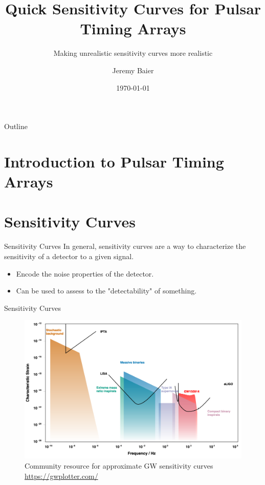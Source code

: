 \documentclass{beamer}
\title[PTA Sensitivity]{Quick Sensitivity Curves for Pulsar Timing Arrays}
\subtitle{Making unrealistic sensitivity curves more realistic}
\author[Jeremy Baier]{Jeremy Baier}
\institute[OSU]{Oregon State University}
\date{\today}
\begin{document}
\begin{frame}
    \titlepage
\end{frame}

\begin{frame}{Outline}
    \tableofcontents
\end{frame}

\section{Introduction to Pulsar Timing Arrays}






\section{Sensitivity Curves}
\begin{frame}{Sensitivity Curves}
    In general, sensitivity curves are a way to characterize the sensitivity of a detector to a given signal.
    \begin{itemize}
        \item Encode the noise properties of the detector.
        \item Can be used to assess to the "detectability" of something.
    \end{itemize}
\end{frame}

\begin{frame}{Sensitivity Curves}
    \begin{figure}
        \centering
        \includegraphics[width=\linewidth]{figs/gwplotter.png}
        \caption{Community resource for approximate GW sensitivity curves
        \centering \url{https://gwplotter.com/}
        }
        \label{fig:sensitivity_curve}
    \end{figure}
\end{frame}
\end{document}
